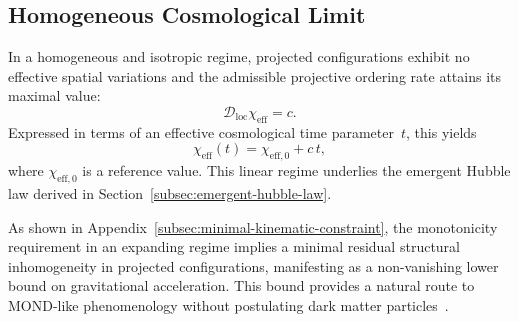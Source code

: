 \subsection{Homogeneous Cosmological Limit}
  \label{subsec:homogeneous-cosmological-limit}

  In a homogeneous and isotropic regime, projected configurations exhibit no
  effective spatial variations and the admissible projective ordering rate
  attains its maximal value:
  \begin{equation}
    \mathcal{D}_{\mathrm{loc}}\chi_{\mathrm{eff}} = c .
  \end{equation}
  Expressed in terms of an effective cosmological time parameter~$t$, this
  yields
  \begin{equation}
    \chi_{\mathrm{eff}}(t) = \chi_{\mathrm{eff},0} + c\, t ,
  \end{equation}
  where $\chi_{\mathrm{eff},0}$ is a reference value.
  This linear regime underlies the emergent Hubble law derived in
  Section~\ref{subsec:emergent-hubble-law}.

  As shown in
  Appendix~\ref{subsec:minimal-kinematic-constraint}, the monotonicity
  requirement in an expanding regime implies a minimal residual structural
  inhomogeneity in projected configurations, manifesting as a non-vanishing
  lower bound on gravitational acceleration.
  This bound provides a natural route to MOND-like phenomenology without
  postulating dark matter
  particles~\cite{Milgrom2002,FamaeyMcGaugh2012}.
